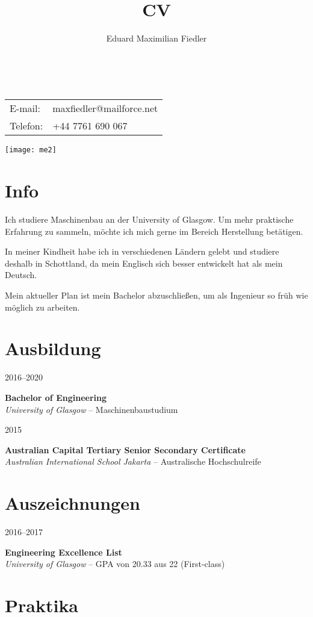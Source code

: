 \documentclass[a4paper]{article}
\title{CV}
\author{Eduard Maximilian Fiedler}
\makeatletter
\renewcommand{\maketitle}{
\begin{flushleft}
{\Huge
\theauthor} \\
\vspace{2mm}
\begin{tabular}{@{} l l}
	E-mail: &maxfiedler@mailforce.net\\
	Telefon: &+44 7761 690 067
\end{tabular}

\end{flushleft}
}
\newcommand{\entry}[4]{

	\begin{minipage}[t]{.20\textwidth}
		\hfill \textsc{#1}

	\end{minipage}
	\hfill\vline\hfill
	\begin{minipage}[t]{.75\textwidth}
		\textbf{#2} \\ 
		\textit{#3}    
		#4

	\end{minipage} 
	\vspace{.25cm}

}
\makeatother
\begin{document}

\begin{minipage}{0.73\textwidth}
\maketitle
\end{minipage}
\begin{minipage}{0.25\textwidth}
	\hspace{2mm} 
	\texttt{[image: me2]}
\end{minipage}

\section{Info}
Ich studiere Maschinenbau an der University of Glasgow. Um mehr praktische Erfahrung zu sammeln, m{\"o}chte ich mich gerne im Bereich Herstellung bet{\"a}tigen.

\vspace{.25cm}

In meiner Kindheit habe ich in verschiedenen L{\"a}ndern gelebt und studiere deshalb in Schottland, da mein Englisch sich besser entwickelt hat als mein Deutsch.

\vspace{.25cm}

Mein aktueller Plan ist mein Bachelor abzuschlie{\ss}en, um als Ingenieur so fr{\"u}h wie m{\"o}glich zu arbeiten.


\section{Ausbildung}

\entry{2016--2020}{Bachelor of Engineering}{University of Glasgow}{-- Maschinenbaustudium}

\entry{2015}{Australian Capital Tertiary Senior Secondary Certificate}{Australian International School Jakarta}{-- Australische Hochschulreife}


\section{Auszeichnungen}

\entry{2016--2017}{Engineering Excellence List}{University of Glasgow}{-- GPA von 20.33 aus 22 (First-class)}

\section{Praktika}
\end{document}
